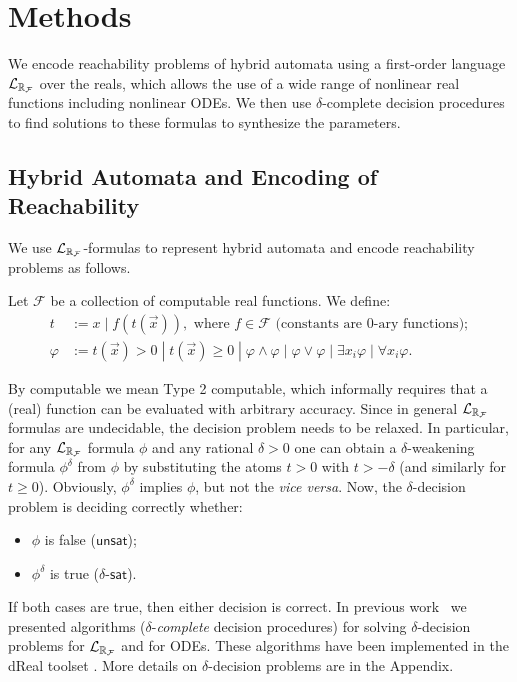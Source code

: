 \section{Methods}

We encode reachability problems of hybrid automata using a first-order language $\mathcal{L}_{\mathbb{R}_{\mathcal{F}}}$ over the reals, 
which allows the use of a wide range of nonlinear real functions including nonlinear ODEs. 
We then use $\delta$-complete decision procedures to find solutions to these formulas to synthesize 
the parameters. 

\subsection{Hybrid Automata and Encoding of Reachability}\label{language}
We use $\mathcal{L}_{\mathbb{R}_{\mathcal{F}}}$-formulas to represent hybrid automata and encode reachability problems as follows. 
\begin{definition}
Let $\mathcal{F}$ be a collection of computable real functions. We define:
\begin{align*}
t& := x \; | \; f(t(\vec x)), \mbox{ where }f\in \mathcal{F} \mbox{ (constants are 0-ary functions)};\\
\varphi& := t(\vec x)> 0 \; | \; t(\vec x)\geq 0 \; | \; \varphi\wedge\varphi
\; | \; \varphi\vee\varphi \; | \; \exists x_i\varphi \; |\; \forall x_i\varphi.
\end{align*}
\end{definition}
By computable we mean Type 2 computable, which informally requires that a (real) function can
be evaluated with arbitrary accuracy. Since in general 
$\mathcal{L}_{\mathbb{R}_{\mathcal{F}}}$ formulas are undecidable, the decision problem needs to be relaxed. In particular, for 
any $\mathcal{L}_{\mathbb{R}_{\mathcal{F}}}$ formula $\phi$ and any rational $\delta >0$ one can obtain a $\delta$-weakening 
formula $\phi^\delta$ from $\phi$ by substituting the atoms $t > 0$ with $t > -\delta$ (and
similarly for $t \geq 0$). Obviously, $\phi^\delta$ implies $\phi$, but not the {\em vice versa}.
Now, the $\delta$-decision problem is deciding correctly whether:
\begin{itemize}
	\item $\phi$ is false ($\mathsf{unsat}$);
	\item $\phi^\delta$ is true ($\delta$-$\mathsf{sat}$).
\end{itemize}
If both cases are true, then either decision is correct. In previous work~\cite{gao12a,gao12b,gao13}
we presented algorithms ($\delta$-{\em complete} decision procedures) for solving $\delta$-decision 
problems for $\mathcal{L}_{\mathbb{R}_{\mathcal{F}}}$ and for ODEs. These algorithms have been implemented in the dReal 
toolset \cite{dreal}. More details on $\delta$-decision problems are in the Appendix. 

